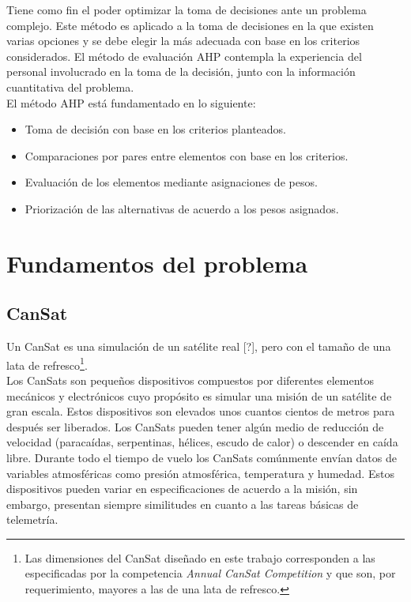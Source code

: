 \noindent Tiene como fin el poder optimizar la toma de decisiones ante un problema complejo. Este m\'etodo es aplicado a la toma de decisiones en la que existen varias opciones y se debe elegir la m\'as adecuada con base en los criterios considerados. El m\'etodo de evaluaci\'on AHP contempla la experiencia del personal involucrado en la toma de la decisi\'on, junto con la informaci\'on cuantitativa del problema.\\

\noindent El m\'etodo AHP est\'a fundamentado en lo siguiente:

\begin{itemize}
	\item Toma de decisi\'on con base en los criterios planteados.
	\item Comparaciones por pares entre elementos con base en los criterios.
	\item Evaluaci\'on de los elementos mediante asignaciones de pesos.
	\item Priorizaci\'on de las alternativas de acuerdo a los pesos asignados.
\end{itemize}

	\section{Fundamentos del problema} \label{sec:basics}
		\subsection{CanSat} \label{subsec:cansat}
Un CanSat es una simulaci\'on de un sat\'elite real [?], pero con el tama\~{n}o de una lata de refresco\footnote{Las dimensiones del CanSat dise\~{n}ado en este trabajo corresponden a las especificadas por la competencia \textit{Annual CanSat Competition} y que son, por requerimiento, mayores a las de una lata de refresco.}.\\

\noindent Los CanSats son peque\~{n}os dispositivos compuestos por diferentes elementos mec\'anicos y electr\'onicos cuyo prop\'osito es simular una misi\'on de un sat\'elite de gran escala. Estos dispositivos son elevados unos cuantos cientos de metros para despu\'es ser liberados. Los CanSats pueden tener alg\'un medio de reducci\'on de velocidad (paraca\'idas, serpentinas, h\'elices, escudo de calor) o descender en ca\'ida libre. Durante todo el tiempo de vuelo los CanSats com\'unmente env\'ian datos de variables atmosf\'ericas como presi\'on atmosf\'erica, temperatura y humedad. Estos dispositivos pueden variar en especificaciones de acuerdo a la misi\'on, sin embargo, presentan siempre similitudes en cuanto a las tareas b\'asicas de telemetr\'ia.\\

